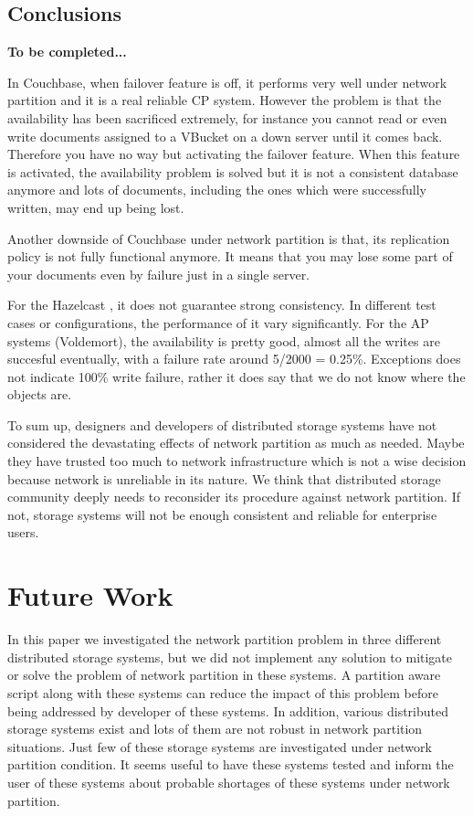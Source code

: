 \documentclass[a4paper]{article}
\begin{document}
\subsection{Conclusions}

{\bf To be completed...}

In Couchbase, when failover feature is off, it performs very well under network partition and it is a real reliable CP system.
However the problem is that the availability has been sacrificed extremely, for instance you cannot read or even write documents assigned to a VBucket on a down server until it comes back.
Therefore you have no way but activating the failover feature. 
When this feature is activated, the availability problem is solved but it is not a consistent database anymore and lots of documents, including the ones which were successfully written, may end up being lost. 

Another downside of Couchbase under network partition is that, its replication policy is not fully functional anymore.
It means that you may lose some part of your documents even by failure just in a single server.

For the Hazelcast , it does not guarantee strong consistency. In different test cases or configurations, the performance of it
vary significantly.
For the AP systems (Voldemort), the availability is pretty good, almost all the writes are succesful eventually, with a failure rate around 5/2000 = 0.25\%.
Exceptions does not indicate 100\% write failure, rather it does say that we do not know where the objects are.

To sum up, designers and developers of distributed storage systems have not considered the devastating effects of network partition as much as needed.
Maybe they have trusted too much to network infrastructure which is not a wise decision because network is unreliable in its nature.
We think that distributed storage community deeply needs to reconsider its procedure against network partition.
If not, storage systems will not be enough consistent and reliable for enterprise users.


\section{Future Work}
In this paper we investigated the network partition problem in three different distributed storage systems, but we did not implement any solution to mitigate or solve the problem of network partition in these systems. 
A partition aware script along with these systems can reduce the impact of this problem before being addressed by developer of these systems.
In addition, various distributed storage systems exist and lots of them are not robust in network partition situations.
Just few of these storage systems are investigated under network partition condition.
It seems useful to have these systems tested and inform the user of these systems about probable shortages of these systems under network partition.
\end{document}
